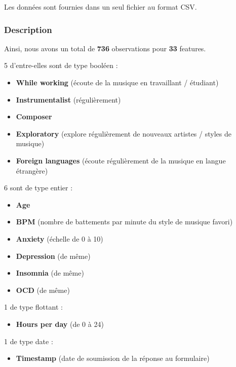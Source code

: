 \documentclass[
]{article}
\providecommand{\tightlist}{%
  \setlength{\itemsep}{0pt}\setlength{\parskip}{0pt}}
\begin{document}
Les données sont fournies dans un seul fichier au format CSV.

\subsubsection{Description}\label{description}

Ainsi, nous avons un total de \textbf{736} observations pour \textbf{33}
features.

5 d'entre-elles sont de type booléen :

\begin{itemize}
\tightlist
\item
  \textbf{While working} (écoute de la musique en travaillant /
  étudiant)
\item
  \textbf{Instrumentalist} (régulièrement)
\item
  \textbf{Composer}
\item
  \textbf{Exploratory} (explore régulièrement de nouveaux artistes /
  styles de musique)
\item
  \textbf{Foreign languages} (écoute régulièrement de la musique en
  langue étrangère)
\end{itemize}

6 sont de type entier :

\begin{itemize}
\tightlist
\item
  \textbf{Age}
\item
  \textbf{BPM} (nombre de battements par minute du style de musique
  favori)
\item
  \textbf{Anxiety} (échelle de 0 à 10)
\item
  \textbf{Depression} (de même)
\item
  \textbf{Insomnia} (de même)
\item
  \textbf{OCD} (de même)
\end{itemize}

1 de type flottant :

\begin{itemize}
\tightlist
\item
  \textbf{Hours per day} (de 0 à 24)
\end{itemize}

1 de type date :

\begin{itemize}
\tightlist
\item
  \textbf{Timestamp} (date de soumission de la réponse au formulaire)
\end{itemize}
\end{document}
